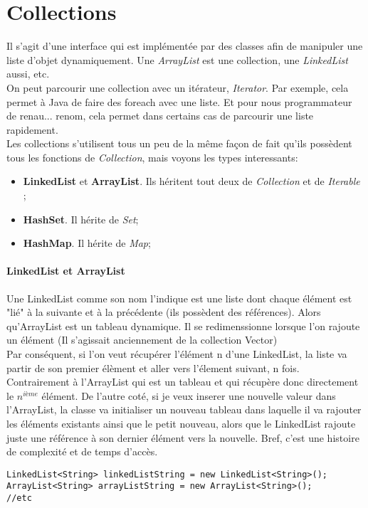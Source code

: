 \documentclass{article}
\begin{document}
\section{Collections}
Il s'agit d'une interface qui est implémentée par des classes afin de manipuler une liste d'objet dynamiquement. Une \emph{ArrayList} est une collection, une \emph{LinkedList} aussi, etc.\\
On peut parcourir une collection avec un itérateur, \emph{Iterator}. Par exemple, cela permet à Java de faire des foreach avec une liste. Et pour nous programmateur de renau... renom, cela permet dans certains cas de parcourir une liste rapidement.\\
Les collections s'utilisent tous un peu de la même façon de fait qu'ils possèdent tous les fonctions de \emph{Collection}, mais voyons les types interessants:
\begin{itemize}
\item{\textbf{LinkedList} et \textbf{ArrayList}. Ils héritent tout deux de \emph{Collection} et de \emph{Iterable} ;}
\item{\textbf{HashSet}. Il hérite de \emph{Set};}
\item{\textbf{HashMap}. Il hérite de \emph{Map};}
\end{itemize}

\paragraph{LinkedList et ArrayList} Une LinkedList comme son nom l'indique est une liste dont chaque élément est "lié" à la suivante et à la précédente (ils possèdent des références). Alors qu'ArrayList est un tableau dynamique. Il se redimenssionne lorsque l'on rajoute un élément (Il s'agissait anciennement de la collection Vector)\\
Par conséquent, si l'on veut récupérer l'élément n d'une LinkedList, la liste va partir de son premier élèment et aller vers l'élement suivant, n fois. Contrairement à l'ArrayList qui est un tableau et qui récupère donc directement le $n^{ième}$ élément. De l'autre coté, si je veux inserer une nouvelle valeur dans l'ArrayList, la classe va initialiser un nouveau tableau dans laquelle il va rajouter les éléments existants ainsi que le petit nouveau, alors que le LinkedList rajoute juste une référence à son dernier élément vers la nouvelle.
Bref, c'est une histoire de complexité et de temps d'accès.
\begin{lstlisting}
LinkedList<String> linkedListString = new LinkedList<String>();
ArrayList<String> arrayListString = new ArrayList<String>();
//etc
\end{lstlisting}
\end{document}
